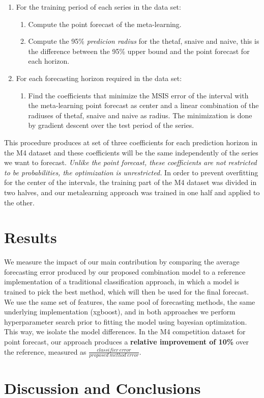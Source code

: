 \documentclass[11pt,a4paper,]{article}
\providecommand{\tightlist}{%
  \setlength{\itemsep}{0pt}\setlength{\parskip}{0pt}}
\theoremstyle{definition}
\theoremstyle{definition}
\theoremstyle{definition}
\theoremstyle{remark}
\begin{document}
\begin{enumerate}
\def\labelenumi{\arabic{enumi}.}
\tightlist
\item
  For the training period of each series in the data set:

  \begin{enumerate}
  \def\labelenumii{\arabic{enumii}.}
  \tightlist
  \item
    Compute the point forecast of the meta-learning.
  \item
    Compute the 95\% \emph{predicion radius} for the thetaf, snaive and
    naive, this is the difference between the 95\% upper bound and the
    point forecast for each horizon.
  \end{enumerate}
\item
  For each forecasting horizon required in the data set:

  \begin{enumerate}
  \def\labelenumii{\arabic{enumii}.}
  \tightlist
  \item
    Find the coefficients that minimize the MSIS error of the interval
    with the meta-learning point forecast as center and a linear
    combination of the radiuses of thetaf, snaive and naive as radius.
    The minimization is done by gradient descent over the test period of
    the series.
  \end{enumerate}
\end{enumerate}

This procedure produces at set of three coefficients for each prediction
horizon in the M4 dataset and these coefficients will be the same
independently of the series we want to forecast. \emph{Unlike the point
forecast, these coefficients are not restricted to be probabilities, the
optimization is unrestricted.} In order to prevent overfitting for the
center of the intervals, the training part of the M4 dataset was divided
in two halves, and our metalearning approach was trained in one half and
applied to the other.

\section{Results}\label{results}

We measure the impact of our main contribution by comparing the average
forecasting error produced by our proposed combination model to a
reference implementation of a traditional classification approach, in
which a model is trained to pick the best method, which will then be
used for the final forecast. We use the same set of features, the same
pool of forecasting methods, the same underlying implementation
(xgboost), and in both approaches we perform hyperparameter search prior
to fitting the model using bayesian optimization. This way, we isolate
the model differences. In the M4 competition dataset for point forecast,
our approach produces a \textbf{relative improvement of 10\%} over the
reference, measured as
\(\frac{classifier\ error}{proposed\ method\ error}\).

\section{Discussion and Conclusions}\label{conclusion}

\printbibliography[title=References]
\end{document}
